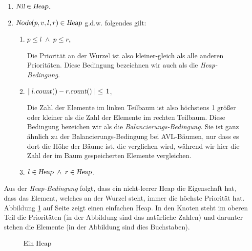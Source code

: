 \begin{enumerate}
\item $\textsl{Nil} \in \textsl{Heap}$.
\item $\textsl{Node}(p,v,l,r) \in \textsl{Heap}$ g.d.w. folgendes gilt:
      \begin{enumerate}
      \item $p \leq l \;\wedge\; p \leq r$,

            Die Priorit\"at an der Wurzel ist also kleiner-gleich als alle anderen Priorit\"aten.
            Diese Bedingung bezeichnen wir auch als die \emph{Heap-Bedingung}.
      \item $\mid l.\textsl{count}() - r.\textsl{count}() \mid \;\leq\, 1$,

            Die Zahl der Elemente im linken Teilbaum ist also h\"ochstens 1 gr\"o\ss{}er oder
            kleiner als die Zahl der Elemente im rechten Teilbaum.
            Diese Bedingung bezeichen wir als die \emph{Balancierungs-Bedingung}.  Sie ist
            ganz \"ahnlich zu der Balancierungs-Bedingung bei AVL-B\"aumen, nur dass es dort
            die H\"ohe der B\"aume ist, die verglichen wird, w\"ahrend wir hier die Zahl der
            im Baum gespeicherten Elemente vergleichen.
      \item $l \in \textsl{Heap} \;\wedge\; r \in \textsl{Heap}$.
      \end{enumerate}
\end{enumerate}
Aus der \emph{Heap-Bedingung} folgt, dass ein nicht-leerer Heap die Eigenschaft hat, dass
das Element, welches an der Wurzel steht, immer die h\"ochste Priorit\"at hat.  Abbildung
\ref{fig:heap-list} auf Seite \pageref{fig:heap-list} zeigt einen einfachen Heap.
In den Knoten steht im oberen Teil die Priorit\"aten (in der Abbildung sind das nat\"urliche Zahlen) und
darunter stehen die Elemente (in der Abbildung sind dies Buchstaben).

\begin{figure}[!t]
  \centering
  \caption{Ein Heap}
  \label{fig:heap-list}
\end{figure}


